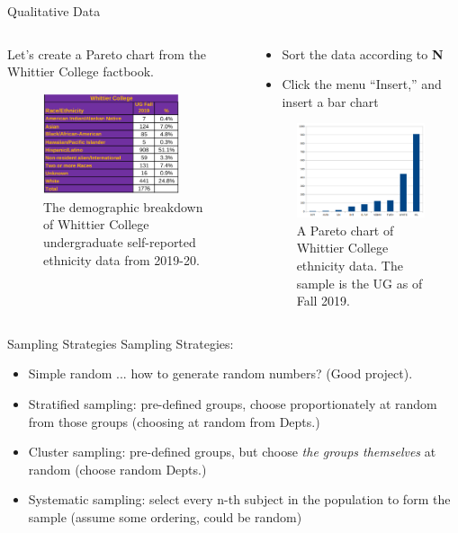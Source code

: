 \documentclass{beamer}
\begin{document}
\begin{frame}{Qualitative Data}
\small
\begin{columns}[T]
\begin{column}{0.5\textwidth}
Let's create a Pareto chart from the Whittier College factbook.
\begin{figure}
\centering
\includegraphics[width=4cm]{figures/race4.png}
\caption{\label{fig:pareto3} The demographic breakdown of Whittier College undergraduate self-reported ethnicity data from 2019-20.}
\end{figure}
\end{column}
\begin{column}{0.5\textwidth}
\begin{itemize}
\item Sort the data according to \textbf{N}
\item Click the menu ``Insert,'' and insert a bar chart
\end{itemize}
\begin{figure}
\centering
\includegraphics[width=5cm]{figures/race5.png}
\caption{A Pareto chart of Whittier College ethnicity data.  The sample is the UG as of Fall 2019.}
\end{figure}
\end{column}
\end{columns}
\end{frame}

\begin{frame}{Sampling Strategies}
\alert{Sampling Strategies:}
\begin{itemize}
\item Simple random ... how to generate random numbers? (Good project).
\item Stratified sampling: pre-defined groups, choose proportionately at random from those groups (choosing at random from Depts.)
\item Cluster sampling: pre-defined groups, but choose \textit{the groups themselves} at random (choose random Depts.)
\item Systematic sampling: select every n-th subject in the population to form the sample (assume some ordering, could be random)
\end{itemize}
\end{frame}
\end{document}

